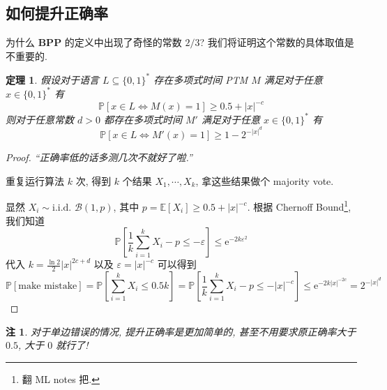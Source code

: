 \documentclass[8pt]{article}
\theoremstyle{compact}
\newtheorem{theorem}{定理}[section]
\newtheorem{remark}{注}[section]
\def\le{\leqslant}
\def\ge{\geqslant}
\def\BPP{\textbf{BPP}}
\begin{document}
\subsection{如何提升正确率}
为什么 $\BPP$ 的定义中出现了奇怪的常数 $2/3$? 我们将证明这个常数的具体取值是不重要的.
\begin{theorem}
	假设对于语言 $L \subseteq \{0, 1\}^*$ 存在多项式时间 PTM $M$ 满足对于任意 $x \in \{0, 1\}^*$ 有 $$\mathbb P[x \in L \Leftrightarrow M(x) = 1] \ge 0.5 + |x|^{-c}$$ 则对于任意常数 $d > 0$ 都存在多项式时间 $M'$ 满足对于任意 $x \in \{0, 1\}^*$ 有 $$\mathbb P[x \in L \Leftrightarrow M'(x) = 1] \ge 1 - 2^{-|x|^d}$$
	\label{robustness}
\end{theorem}
\begin{proof}
	\textit{“正确率低的话多测几次不就好了啦.”}

	重复运行算法 $k$ 次, 得到 $k$ 个结果 $X_1, \cdots, X_k$, 拿这些结果做个 majority vote.
	
	显然 $X_i \sim \text{i.i.d. } \mathcal B(1, p)$, 其中 $p = \mathbb E[X_i] \ge 0.5 + |x|^{-c}$. 根据 Chernoff Bound\footnote{翻 ML notes 把.}, 我们知道 $$\mathbb P\left[ \frac{1}{k}\sum_{i=1}^kX_i - p \le -\varepsilon \right] \le \mathrm{e}^{-2k\varepsilon^2}$$ 代入 $k = \frac{\ln 2}{2}|x|^{2c+d}$ 以及 $\varepsilon = |x|^{-c}$ 可以得到 $$\mathbb P[\text{make mistake}] = \mathbb P\left[ \sum_{i=1}^{k}X_i \le 0.5k\right] = \mathbb P\left[ \frac{1}{k}\sum_{i=1}^kX_i - p \le -|x|^{-c} \right] \le \mathrm{e}^{-2k|x|^{-2c}} = 2^{-|x|^d}$$
\end{proof}
\begin{remark}
	对于单边错误的情况, 提升正确率是更加简单的, 甚至不用要求原正确率大于 $0.5$, 大于 $0$ 就行了!
\end{remark}
\end{document}
